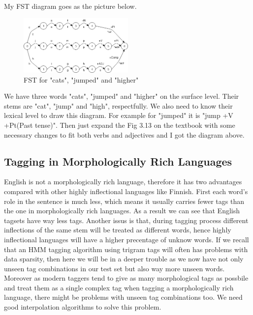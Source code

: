 \documentclass[11pt]{article} %
\begin{document}
My FST diagram goes as the picture below.

\begin{figure}[h]
  \centering
  \includegraphics[width=0.5\textwidth]{images/figure_fst.png}
  \caption{FST for "cats", "jumped" and "higher"}
\end{figure}

We have three words "cats", "jumped" and "higher" on the surface level. Their stems are "cat", "jump" and "high", respectfully. We also need to know their lexical level to draw this diagram. For example for "jumped" it is "jump +V +Pt(Past tense)". Then just expand the Fig 3.13 on the textbook\cite[61]{JurafskyMartin200805} with some necessary changes to fit both verbs and adjectives and I got the diagram above.

\subsection{Tagging in Morphologically Rich Languages}

English is not a morphologically rich language, therefore it has two advantages compared with other highly inflectional languages like Finnish. First each word's role in the sentence is much less, which means it usually carries fewer tags than the one in morphologically rich languages. As a result we can see that English tagsets have way less tags\cite[162]{JurafskyMartin200805}. Another issus is that, during tagging process different inflections of the same stem will be treated as different words, hence highly inflectional languages will have a higher precentage of unknow words. If we recall that an HMM tagging algorithm using trigram tags will often has problems with data sparsity\cite[149]{JurafskyMartin200805}, then here we will be in a deeper trouble as we now have not only unseen tag combinations in our test set but also way more unseen words. Moreover as modern taggers tend to give as many morphological tags as possbile and treat them as a single complex tag when tagging a morphologically rich language, there might be problems with unseen tag combinations too. We need good interpolation algorithms to solve this problem.

\printbibliography
\end{document}
